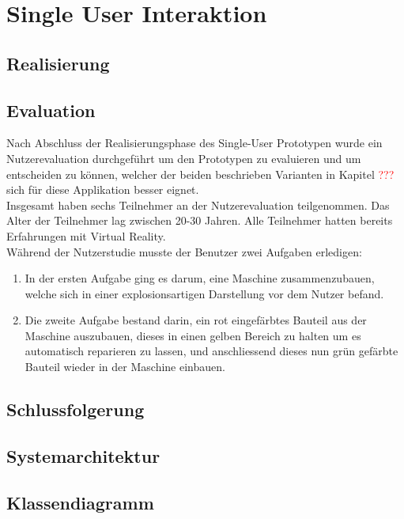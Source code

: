 \chapter{Single User Interaktion}
\label{ch:Single_User_Interaktion}

\section{Realisierung}



\section{Evaluation}
Nach Abschluss der Realisierungsphase des Single-User Prototypen wurde ein Nutzerevaluation durchgeführt um den Prototypen zu evaluieren und um entscheiden zu können, welcher der beiden beschrieben Varianten in Kapitel \textcolor{red}{???} sich für diese Applikation besser eignet. \\

\noindent Insgesamt haben sechs Teilnehmer an der Nutzerevaluation teilgenommen. Das Alter der Teilnehmer lag zwischen 20-30 Jahren. Alle Teilnehmer hatten bereits Erfahrungen mit Virtual Reality. \\

\noindent Während der Nutzerstudie musste der Benutzer zwei Aufgaben erledigen:
\begin{enumerate}
	\item In der ersten Aufgabe ging es darum, eine Maschine zusammenzubauen, welche sich in einer explosionsartigen Darstellung vor dem Nutzer befand.
	
	
	\item Die zweite Aufgabe bestand darin, ein rot eingefärbtes Bauteil aus der Maschine auszubauen, dieses in einen gelben Bereich zu halten um es automatisch reparieren zu lassen, und anschliessend dieses nun grün gefärbte Bauteil wieder in der Maschine einbauen.
	
\end{enumerate}
\section{Schlussfolgerung}

\section{Systemarchitektur}

\section{Klassendiagramm}